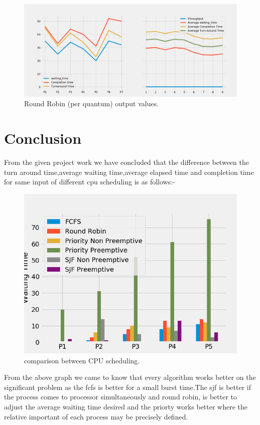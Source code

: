 \documentclass[11pt,a4paper]{report}
\begin{document}
\begin{figure}[H]

	\includegraphics[scale=0.4]{./img/ROUND_ROBIN.png}
	\caption{Round Robin (per quantum) output values.}
\end{figure}




\chapter{Conclusion}
\vskip 1cm
\hspace*{\parindent}From the given project work we have concluded that the difference between the turn around time,average waiting time,average elapsed time and completion time for same input of different cpu scheduling is as follows:-
\vskip 1cm
\begin{figure}[H]
	\centering
	\includegraphics[scale=0.9]{./img/compare.png}
	\caption{comparison between CPU scheduling.}
\end{figure}
\vskip 1cm
From the above graph we came to know that every algorithm works better on the significant problem as the fcfs is better for a small burst time.The sjf is better if the process comes to processor simultaneously and round robin, is better to adjust the average waiting time desired and the priorty works better  where the relative important of each process may be precisely defined.
\end{document}
